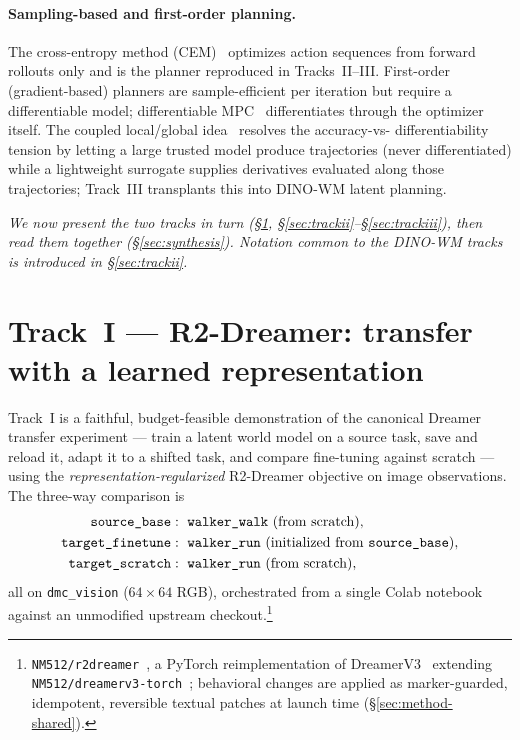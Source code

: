 \documentclass[11pt,a4paper]{article}
\begin{document}
\paragraph{Sampling-based and first-order planning.} The cross-entropy method
(CEM)~\cite{cem} optimizes action sequences from forward rollouts only and is
the planner reproduced in Tracks~II--III. First-order (gradient-based) planners
are sample-efficient per iteration but require a differentiable model;
differentiable MPC~\cite{diffmpc} differentiates through the optimizer itself.
The coupled local/global idea~\cite{fog2026} resolves the accuracy-vs-
differentiability tension by letting a large trusted model produce trajectories
(never differentiated) while a lightweight surrogate supplies derivatives
evaluated along those trajectories; Track~III transplants this into DINO-WM
latent planning.

\bigskip
\noindent\emph{We now present the two tracks in turn (\S\ref{sec:tracki},
\S\ref{sec:trackii}--\S\ref{sec:trackiii}), then read them together
(\S\ref{sec:synthesis}). Notation common to the DINO-WM tracks is introduced in
\S\ref{sec:trackii}.}

\section{Track~I --- R2-Dreamer: transfer with a learned representation}
\label{sec:tracki}

Track~I is a faithful, budget-feasible demonstration of the canonical Dreamer
transfer experiment --- train a latent world model on a source task, save and
reload it, adapt it to a shifted task, and compare fine-tuning against scratch
--- using the \emph{representation-regularized} R2-Dreamer objective on image
observations. The three-way comparison is
\[
\begin{aligned}
\texttt{source\_base} &:~\texttt{walker\_walk}~\text{(from scratch)},\\
\texttt{target\_finetune} &:~\texttt{walker\_run}~\text{(initialized from \texttt{source\_base})},\\
\texttt{target\_scratch} &:~\texttt{walker\_run}~\text{(from scratch)},
\end{aligned}
\]
all on \texttt{dmc\_vision} ($64\times64$ RGB), orchestrated from a single Colab
notebook against an unmodified upstream checkout.\footnote{\texttt{NM512/r2dreamer}~\cite{r2dreamer},
a PyTorch reimplementation of DreamerV3~\cite{dreamerv3} extending
\texttt{NM512/dreamerv3-torch}~\cite{dreamerv3torch}; behavioral changes are
applied as marker-guarded, idempotent, reversible textual patches at launch
time (\S\ref{sec:method-shared}).}
\end{document}
